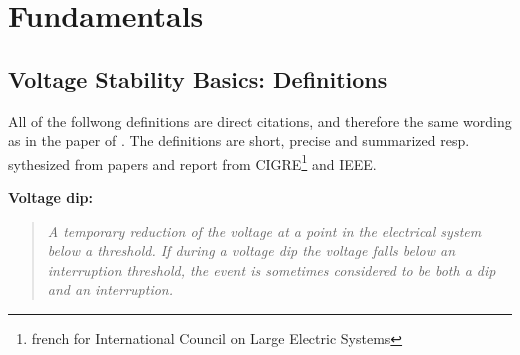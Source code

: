 
\label{app:appendix}


%  
%
%





\chapter{Fundamentals}

\section{Voltage Stability Basics: Definitions}
\label{app:voltage-stability-definitions}

All of the follwong definitions are direct citations, and therefore the same wording as in the paper of \textcite{shoup_2004}. 
The definitions are short, precise and summarized resp. sythesized from papers and report from \ac{CIGRE}\footnote{french for International Council on Large Electric Systems} and \ac{IEEE}.

\textbf{Voltage dip:}
\begin{quote}\itshape
    A temporary reduction of the voltage at a point in the electrical system below a threshold. 
    If during a voltage dip the voltage falls below an interruption threshold, the event is sometimes considered to be both a dip and an interruption.
\end{quote}

